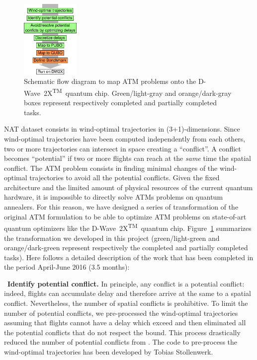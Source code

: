 \documentclass[9pt]{extarticle}
\renewcommand{\figurename}{Figure}
\newcommand{\note}[1][]{\added[remark={#1}]}
\newcommand{\DW}{\mbox{D-Wave 2X\textsuperscript{TM}}~}
\begin{document}
%
\begin{figure}
\centering
\includegraphics[width=0.25\textwidth]{scheme}
\caption{\label{fig:scheme}Schematic flow diagram to map ATM problems onto the \DW quantum chip. Green/light-gray and orange/dark-gray boxes represent
respectively completed and partially completed tasks.}
\end{figure}
%
NAT dataset consists in \note[What is the number of trajectories?]{XXX} wind-optimal trajectories in (3+1)-dimensions. Since wind-optimal
trajectories have been computed independently from each others, two or more trajectories can intersect in space creating a ``conflict''. 
A conflict becomes ``potential'' if two or more flights can reach at the \emph{same} time the spatial conflict. The ATM problem consists
in finding minimal changes of the wind-optimal trajectories to avoid all the potential conflicts. 
Given the fixed architecture and the limited amount of physical resources of the current quantum hardware, it is impossible to directly solve ATMs problems
on quantum annealers. For this reason, we have designed a series of transformation of the original ATM formulation 
to be able to optimize ATM problems on state-of-art quantum optimizers like the \DW quantum chip. \figurename~\ref{fig:scheme} summarizes the transformation 
we developed in this project (green/light-green and orange/dark-green represent respectively the completed and partially completed tasks).
Here follows a detailed description of the work that has been completed in the period April-June 2016 (3.5 months):

\begin{changemargin}{0.5cm}{0cm}
\textbullet~\textbf{Identify potential conflict.} In principle, any conflict is a potential conflict: indeed, flights can accumulate delay
and therefore arrive at the same to a spatial conflict. Nevertheless, the number of spatial conflicts is prohibitive. To limit the number
of potential conflicts, we pre-processed the wind-optimal trajectories assuming that flights cannot have a delay
which exceed \note[Check this]{$1$ hour} and then eliminated all the potential conflicts that do not respect the bound. 
This process drastically reduced the number of potential conflicts from
\note[Please add some numbers.]{XXX to XXX}. The code to pre-process the wind-optimal trajectories has
been developed by Tobias Stollenwerk.
\end{changemargin}
\end{document}
